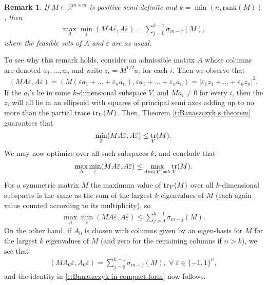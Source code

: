 \documentclass[reqno]{amsart}
\newtheorem{remark}[theorem]{Remark}
\numberwithin{equation}{section}
\newcommand{\R}{\mathbb R}
\DeclareMathOperator{\tr}{\mathrm\mathrm{tr}}
\begin{document}
\begin{remark}\label{r:Banaszczyk's theorem restated}
 If $M \in \R^{m\times m}$ is   positive semi-definite and $k = \min (n,\text{rank}(M))$,  then
  \begin{align}\label{e:Banaszczyk in compact form}
     \max_{A} \min_{\overline \varepsilon} (MA\overline\varepsilon,A\overline\varepsilon) = \sum\limits_{j=0}^{k-1}\sigma_{m-j}(M),
  \end{align}  
  where the feasible sets of $A$ and $\overline \varepsilon$ are as usual.
  \end{remark}
  
  To see why this remark holds, consider an admissible matrix $A$ whose columns are denoted $a_1,\ldots,a_n$ and write $z_i = M^{1/2}a_i$ for each $i$. Then we observe that 
  \begin{align*}
    (MA\overline \varepsilon,A\overline \varepsilon) = (M(\varepsilon a_1+\ldots +\varepsilon_n a_n),\varepsilon a_1+\ldots +\varepsilon_n a_n) = |\varepsilon_1 z_1+\ldots+\varepsilon_n z_n|^2. 
  \end{align*} 
   If the $a_i$'s lie in some $k$-dimensional subspace $V$, and $Ma_i\neq0 $ for every $i$, then the $z_i$ will all lie in an ellipsoid with squares of principal semi axes adding up to no more than the partial trace $\tr_V(M)$. Then, Theorem \ref{t:Banaszczyk s theorem} guarantees that
  \begin{align*}
    \min_{\overline \varepsilon} (MA\overline \varepsilon, A\overline \varepsilon) \leq \tr_V(M).
  \end{align*} 
  We may now optimize over all such subspaces $k$, and conclude that 
   \begin{align*}
     \max_{A} \min_{\overline \varepsilon} (MA\overline \varepsilon, A\overline \varepsilon) \leq \max_{\dim(V)=k}\tr_V(M).   
   \end{align*}
   For a symmetric matrix $M$ the maximum value of $\tr_V(M)$ over all $k$-dimensional subspaces is the same as the sum of the largest $k$ eigenvalues of $M$ (each again value counted according to its multiplicity), so
   \begin{align*}
     \max_A \min_{\overline \varepsilon} (MA\overline \varepsilon,A\overline \varepsilon) \leq \sum\limits_{j=0}^{k-1} \sigma_{m-j}(M).
   \end{align*} 
   On the other hand, if $A_0$ is chosen with columns given by an eigen-basis for $M$ for the largest $k$ eigenvalues of $M$ (and zero for the remaining columns if $n>k$), we see that 
   \begin{align*}
     (MA_0\overline \varepsilon,A_0\overline \varepsilon) = \sum\limits_{j=0}^{k-1} \sigma_{m-j}(M),\;\forall\;\overline \varepsilon \in \{-1,1\}^n,
   \end{align*}
  and the identity in \eqref{e:Banaszczyk in compact form} now follows.
\end{document}
